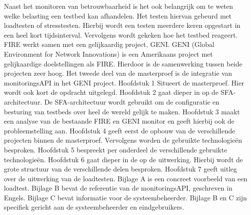 \npar
Naast het monitoren van betrouwbaarheid is het ook belangrijk om te weten welke belasting een testbed kan afhandelen. Het testen hiervan gebeurd met loadtesten of stresstesten. Hierbij wordt een testen meerdere keren opgestart in een heel kort tijdsinterval. Vervolgens wordt gekeken hoe het testbed reageert.
\npar
FIRE werkt samen met een gelijkaardig project, GENI. GENI (Global Environment for Network Innovations) is een Amerikaans project met gelijkaardige doelstellingen als FIRE. Hierdoor is de samenwerking tussen beide projecten zeer hoog. Het tweede deel van de masterproef is de integratie van monitoringsAPI in het GENI project.
\npar
Hoofdstuk 1 Situeert de masterproef. Hier wordt ook kort de opdracht uitgelegd.
\npar
Hoofdstuk 2 gaat dieper in op de SFA-architectuur. De SFA-architectuur wordt gebruikt om de configuratie en besturing van testbeds over heel de wereld gelijk te maken.
\npar
Hoofdstuk 3 maakt een analyse van de bestaande FIRE en GENI monitor en geeft hierbij ook de probleemstelling aan.
\npar
Hoofdstuk 4 geeft eerst de opbouw van de verschillende projecten binnen de masterproef. Vervolgens worden de gebruikte technologie\"en besproken.
\npar
Hoofdstuk 5 bespreekt per onderdeel de verschillende gebruikte technologie\"en.
\npar
Hoofdstuk 6 gaat dieper in de op de uitwerking. Hierbij wordt de grote structuur van de verschillende delen besproken.
\npar
Hoofdstuk 7 geeft uitleg over de uitwerking van de loadtesten.
\npar
Bijlage A is een concreet voorbeeld van een loadtest.
\npar
Bijlage B bevat de referentie van de monitoringsAPI, geschreven in Engels.
\npar
Bijlage C bevat informatie voor de systeembeheerder.
\npar 
Bijlage B en C zijn specifiek gericht aan de systeembeheerder en eindgebruikers.